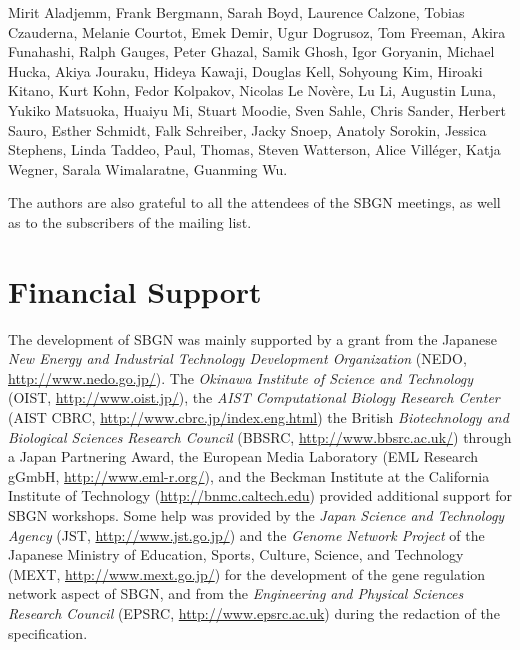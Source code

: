 Mirit Aladjemm, Frank Bergmann, Sarah Boyd, Laurence Calzone, Tobias Czauderna, Melanie Courtot, Emek Demir, Ugur Dogrusoz, Tom Freeman, Akira Funahashi, Ralph
Gauges, Peter Ghazal, Samik Ghosh, Igor Goryanin, Michael Hucka, Akiya Jouraku, Hideya Kawaji, Douglas Kell, Sohyoung Kim, Hiroaki Kitano, Kurt
Kohn, Fedor Kolpakov, Nicolas Le Nov\`{e}re, Lu Li, Augustin Luna, Yukiko Matsuoka, Huaiyu Mi, Stuart Moodie, Sven Sahle, Chris Sander, Herbert
Sauro, Esther Schmidt, Falk Schreiber, Jacky Snoep, Anatoly Sorokin, Jessica Stephens, Linda Taddeo, Paul, Thomas, Steven Watterson, Alice Vill\'{e}ger, Katja
Wegner, Sarala Wimalaratne, Guanming Wu.

The authors are also grateful to all the attendees of the SBGN meetings, as well as to the subscribers of the  mailing list.

\section{Financial Support}

The development of SBGN was mainly supported by a grant from the Japanese \emph{New Energy and Industrial Technology Development Organization} (NEDO, \url{http://www.nedo.go.jp/}).  The \emph{Okinawa Institute of Science and Technology} (OIST, \url{http://www.oist.jp/}), the \emph{AIST Computational Biology Research Center} (AIST CBRC, \url{http://www.cbrc.jp/index.eng.html}) the British \emph{Biotechnology and Biological Sciences Research Council} (BBSRC, \url{http://www.bbsrc.ac.uk/}) through a Japan Partnering Award, the European Media Laboratory (EML Research gGmbH, \url{http://www.eml-r.org/}), and the Beckman Institute at the California Institute of Technology (\url{http://bnmc.caltech.edu}) provided additional support for SBGN workshops.  Some help was provided by the \emph{Japan Science and Technology Agency} (JST, \url{http://www.jst.go.jp/}) and the \emph{Genome Network Project} of the Japanese Ministry of Education, Sports, Culture, Science, and Technology (MEXT, \url{http://www.mext.go.jp/}) for the development of the gene regulation network aspect of SBGN, and from the \emph{Engineering and Physical Sciences Research Council} (EPSRC, \url{http://www.epsrc.ac.uk}) during the redaction of the specification.